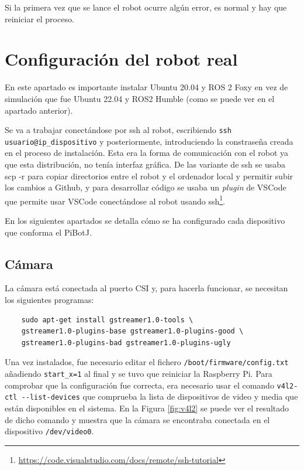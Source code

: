 Si la primera vez que se lance el robot ocurre algún error, es normal y hay que reiniciar el proceso.

\section*{Configuración del robot real}
\label{subsec:anexoconfig}

En este apartado es importante instalar Ubuntu 20.04 y ROS 2 Foxy en vez de simulación que fue Ubuntu 22.04 y ROS2 Humble (como se puede ver en el apartado anterior).
 
Se va a trabajar conectándose por ssh al robot, escribiendo \verb|ssh usuario@ip_dispositivo| y posteriormente, introduciendo la constraseña creada en el proceso de instalación. Esta era la forma de comunicación con el robot ya que esta distribución, no tenía interfaz gráfica. De las variante de ssh se usaba scp -r para copiar directorios entre el robot y el ordenador local y permitir subir los cambios a Github, y para desarrollar código se usaba un \textit{plugin} de VSCode que permite usar VSCode conectándose al robot usando ssh\footnote{\url{https://code.visualstudio.com/docs/remote/ssh-tutorial}}. 
 
En los siguientes apartados se detalla cómo se ha configurado cada dispositivo que conforma el PiBotJ.

\subsection*{Cámara}
\label{subsec:anexocamara}

La cámara está conectada al puerto CSI y, para hacerla funcionar, se necesitan los siguientes programas: 

\begin{verbatim}
	sudo apt-get install gstreamer1.0-tools \ 
	gstreamer1.0-plugins-base gstreamer1.0-plugins-good \ 
	gstreamer1.0-plugins-bad gstreamer1.0-plugins-ugly
\end{verbatim}

Una vez instalados, fue necesario editar el fichero \verb|/boot/firmware/config.txt| añadiendo \verb|start_x=1| al final y se tuvo que reiniciar la Raspberry Pi. Para comprobar que la configuración fue correcta, era necesario usar el comando \verb|v4l2-ctl --list-devices|  que comprueba la lista de dispositivos de video y media que están disponibles en el sistema. En la Figura \ref{fig:v4l2} se puede ver el resultado de dicho comando y  muestra que la cámara se encontraba conectada en el dispositivo \verb|/dev/video0|.


